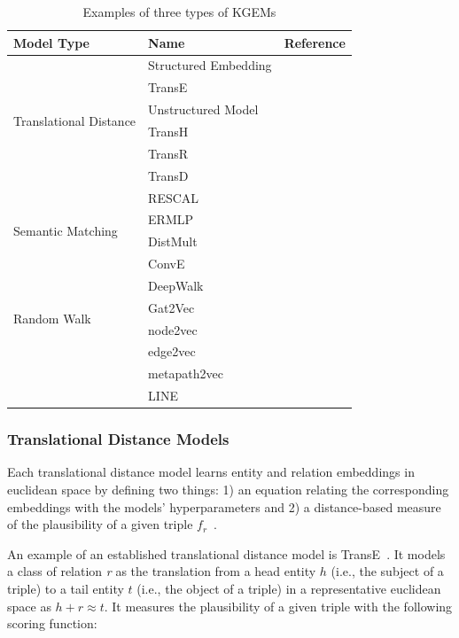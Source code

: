 \begin{table}
    \centering
    \begin{tabular}{ l l l }
        \hline
        Model Type & Name & Reference \\
        \hline
        \multirow{6}{*}{Translational Distance}
        & Structured Embedding & ~\cite{Bordes2011}  \\
        & TransE & ~\cite{Bordes2013} \\
        & Unstructured Model & ~\cite{Bordes2014} \\
        & TransH & ~\cite{Wang2014} \\
        & TransR & ~\cite{Lin2015} \\
        & TransD & ~\cite{Ji2015} \\
        \hline
        \multirow{4}{*}{Semantic Matching}
        & RESCAL & ~\cite{Nickel2011} \\
        & ERMLP & ~\cite{Dong2014} \\
        & DistMult & ~\cite{Yang2014}  \\
        & ConvE & ~\cite{Dettmers2017} \\
        \hline
        \multirow{4}{*}{Random Walk}
        & DeepWalk & ~\cite{Perozzi2014} \\
        & Gat2Vec & ~\cite{Sheikh2018} \\
        & node2vec & ~\cite{Grover2016} \\
        & edge2vec & ~\cite{Gao2018} \\
        & metapath2vec & ~\cite{Dong2017} \\
        & LINE & ~\cite{Tang2015} \\
        \hline
    \end{tabular}
    \caption{Examples of three types of \acp{KGEM}}\label{tab:kgem_examples}
\end{table}

\subsubsection{Translational Distance Models}

Each translational distance model learns entity and relation embeddings in euclidean space by defining two things: 1) an equation relating the corresponding embeddings with the models' hyperparameters and 2) a distance-based measure of the plausibility of a given triple $f_r$~\cite{Wang2017}.

An example of an established translational distance model is TransE~\cite{Bordes2013}.
It models a class of relation \textit{r} as the translation from a head entity $h$ (i.e., the subject of a triple) to a tail entity $t$ (i.e., the object of a triple) in a representative euclidean space as $h + r \approx t$.
It measures the plausibility of a given triple with the following scoring function:

